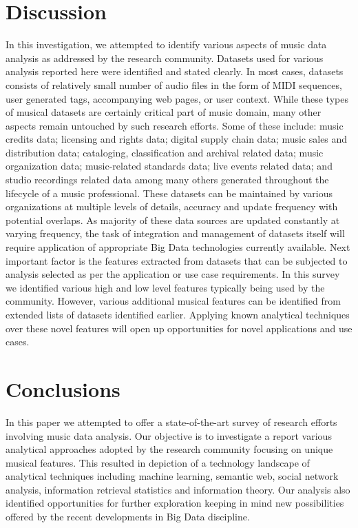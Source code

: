\documentclass{proc}
\begin{document}
\section{Discussion}
In this investigation, we attempted to identify various aspects of music data analysis as addressed by the research community. Datasets used for various analysis reported here were identified and stated clearly. In most cases, datasets consists of relatively small number of audio files in the form of MIDI sequences, user generated tags, accompanying web pages, or user context. While these types of musical datasets are certainly critical part of music domain, many other aspects remain untouched by such research efforts. Some of these include: music credits data; licensing and rights data; digital supply chain data; music sales and distribution data; cataloging, classification and archival related data; music organization data; music-related standards data; live events related data; and studio recordings related data among many others generated throughout the lifecycle of a music professional. These datasets can be maintained by various organizations at multiple levels of details, accuracy and update frequency with potential overlaps. As majority of these data sources are updated constantly at varying frequency, the task of integration and management of datasets itself will require application of appropriate Big Data technologies currently available.  
Next important factor is the features extracted from datasets that can be subjected to analysis selected as per the application or use case requirements. In this survey we identified various high and low level features typically being used by the community. However, various additional musical features can be identified from extended lists of datasets identified earlier. Applying known analytical techniques over these novel features will open up opportunities for novel applications and use cases. 

\section{Conclusions}
In this paper we attempted to offer a state-of-the-art survey of research efforts involving music data analysis. Our objective is to investigate a report various analytical approaches adopted by the research community focusing on unique musical features. This resulted in depiction of a technology landscape of analytical techniques including machine learning, semantic web, social network analysis, information retrieval statistics and information theory. Our analysis also identified opportunities for further exploration keeping in mind new possibilities offered by the recent developments in Big Data discipline. 
\end{document}
